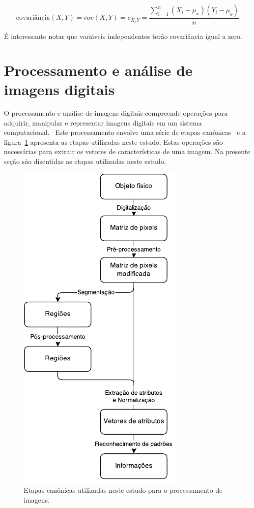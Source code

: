 \begin{equation}
\text{covariância}(X,Y)=cov(X,Y)=c_{X,Y}=\frac{\sum_{i=1}^{n}(X_i-\mu_x)(Y_i-\mu_y) }{n}
\end{equation}

É interessante notar que variáveis independentes terão covariância
igual a zero.

\section{Processamento e análise de imagens digitais}
\label{sec:fund:imagens}

O processamento e análise de imagens digitais compreende operações para
adquirir, manipular e representar imagens digitais em um sistema
computacional.~\cite{gonzalez} Este processamento envolve uma série de
etapas canônicas~\cite{luciano} e a figura~\ref{fig:etapas-pdi}
apresenta as etapas utilizadas neste estudo. Estas operações são
necessárias para extrair os vetores de características de uma
imagem. Na presente seção são discutidas as etapas utilizadas neste
estudo.

\begin{figure}[ht!]
\begin{center}
 \caption{Etapas
      canônicas utilizadas neste estudo para o processamento de
      imagens.}  
\label{fig:etapas-pdi}
        \includegraphics[scale=1.]{figs/etapas_pdi} 
\fonteminha
\end{center}
\end{figure}

